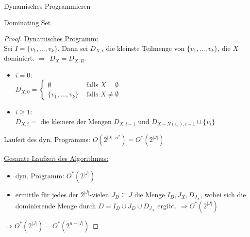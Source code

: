 \begin{chapter}{Dynamisches Programmieren}
\begin{section}{Dominating Set}
\begin{proof}
    \underline{Dynamisches Programm:}\\
    Sei $I = \{v_1,\dots,v_k\}$. Dann sei $D_{X,i}$ die kleinste Teilmenge von $\{v_1,\dots,v_k\}$, die $X$ dominiert. $\Rightarrow$ $D_X = D_{X,R}$.\\
    \begin{itemize}
     \item $i = 0$:\\
      $D_{X,0} = \begin{cases}
		  \emptyset & \text{ falls } X = \emptyset\\
		  \{v_1,\dots,v_k\} & \text{ falls } X \neq \emptyset
               \end{cases}$
     \item $i \geq 1$:\\
     $D_{X,i} = $ die kleinere der Mengen $D_{X,i-1}$ und $D_{X-N(v_i),i-1} \cup \{v_i\}$
    \end{itemize}
    Laufeit des dyn. Programms: $O(2^{|J|\cdot n^2}) = O^*(2^{|J|})$
    
    \underline{Gesamte Laufzeit des Algorithmus:}\\
    \begin{itemize}
     \item dyn. Programm: $O^*(2^{|J|})$
     \item ermittle für jedes der $2^{|J|}$-vielen $J_D \subseteq J$ die Menge $I_D,J_X,D_{J_X}$, wobei sich die dominierende Menge durch $D= I_D \cup J_D \cup D_{J_X}$ ergibt. $\Rightarrow O^*(2^{|J|})$
    \end{itemize}
    $\Rightarrow O^*(2^{|J|})= O^*(2^{n-|I|})$
  \end{proof}  
  

\end{section}
\end{chapter}

